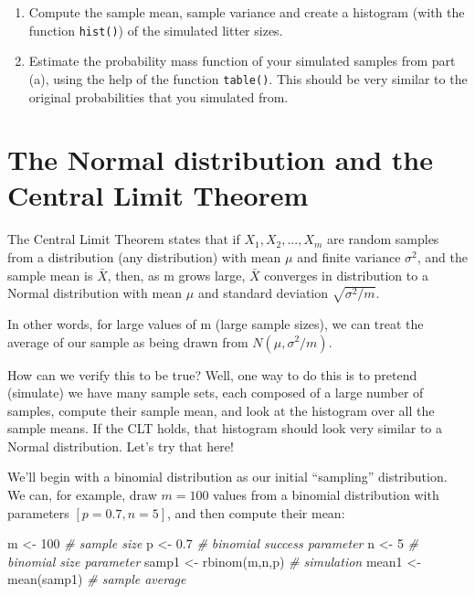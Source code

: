 \documentclass[
]{book}
\newenvironment{Shaded}{\begin{snugshade}}{\end{snugshade}}
\newcommand{\CommentTok}[1]{\textcolor[rgb]{0.56,0.35,0.01}{\textit{#1}}}
\newcommand{\DecValTok}[1]{\textcolor[rgb]{0.00,0.00,0.81}{#1}}
\newcommand{\FloatTok}[1]{\textcolor[rgb]{0.00,0.00,0.81}{#1}}
\newcommand{\FunctionTok}[1]{\textcolor[rgb]{0.00,0.00,0.00}{#1}}
\newcommand{\NormalTok}[1]{#1}
\newcommand{\OtherTok}[1]{\textcolor[rgb]{0.56,0.35,0.01}{#1}}
\begin{document}
\begin{enumerate}
\def\labelenumi{\alph{enumi})}
\item
  Compute the sample mean, sample variance and create a histogram (with the function \texttt{hist()}) of the simulated litter sizes.
\item
  Estimate the probability mass function of your simulated samples from part (a), using the help of the function \texttt{table()}. This should be very similar to the original probabilities that you simulated from.
\end{enumerate}

\hypertarget{the-normal-distribution-and-the-central-limit-theorem}{%
\section{The Normal distribution and the Central Limit Theorem}\label{the-normal-distribution-and-the-central-limit-theorem}}

The Central Limit Theorem states that if \(X_1, X_2, ..., X_m\) are random samples from a distribution (any distribution) with mean \(\mu\) and finite variance \(\sigma^2\), and the sample mean is \(\bar{X}\), then, as m grows large, \(\bar{X}\) converges in distribution to a Normal distribution with mean \(\mu\) and standard deviation \(\sqrt{\sigma^2 /m}\).

In other words, for large values of m (large sample sizes), we can treat the average of our sample as being drawn from \(N(\mu,\sigma^2/m)\).

How can we verify this to be true? Well, one way to do this is to pretend (simulate) we have many sample sets, each composed of a large number of samples, compute their sample mean, and look at the histogram over all the sample means. If the CLT holds, that histogram should look very similar to a Normal distribution. Let's try that here!

We'll begin with a binomial distribution as our initial ``sampling'' distribution. We can, for example, draw \(m=100\) values from a binomial distribution with parameters \([p=0.7,n=5]\), and then compute their mean:

\begin{Shaded}
\begin{Highlighting}[]
\NormalTok{m }\OtherTok{\textless{}{-}} \DecValTok{100} \CommentTok{\# sample size}
\NormalTok{p }\OtherTok{\textless{}{-}} \FloatTok{0.7} \CommentTok{\# binomial success parameter}
\NormalTok{n }\OtherTok{\textless{}{-}} \DecValTok{5} \CommentTok{\# binomial size parameter}
\NormalTok{samp1 }\OtherTok{\textless{}{-}} \FunctionTok{rbinom}\NormalTok{(m,n,p)  }\CommentTok{\# simulation}
\NormalTok{mean1 }\OtherTok{\textless{}{-}} \FunctionTok{mean}\NormalTok{(samp1) }\CommentTok{\# sample average}
\end{Highlighting}
\end{Shaded}
\end{document}

